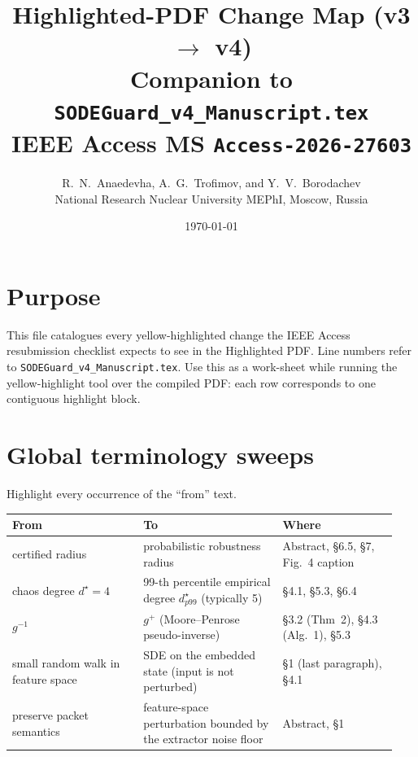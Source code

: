 \documentclass[11pt,letterpaper]{article}
\title{\vspace{-1.2cm}\textbf{Highlighted-PDF Change Map (v3 $\rightarrow$ v4)}\\[4pt]
       \normalsize Companion to \texttt{SODEGuard\_v4\_Manuscript.tex}\\
       \normalsize IEEE Access MS \texttt{Access-2026-27603}}
\author{R.\ N.\ Anaedevha, A.\ G.\ Trofimov, and Y.\ V.\ Borodachev\\
        \normalsize National Research Nuclear University MEPhI, Moscow, Russia}
\date{\normalsize \today}
\begin{document}
\maketitle
\thispagestyle{fancy}
\vspace{-0.6cm}

\section*{Purpose}
This file catalogues every yellow-highlighted change the IEEE Access
resubmission checklist expects to see in the Highlighted PDF. Line
numbers refer to \texttt{SODEGuard\_v4\_Manuscript.tex}. Use this as a
work-sheet while running the yellow-highlight tool over the compiled
PDF: each row corresponds to one contiguous highlight block.

\section{Global terminology sweeps}
Highlight every occurrence of the ``from'' text.
\begin{center}\small
\begin{tabular}{@{}p{0.32\linewidth}p{0.34\linewidth}p{0.28\linewidth}@{}}
\toprule
\textbf{From} & \textbf{To} & \textbf{Where} \\
\midrule
certified radius & probabilistic robustness radius & Abstract, \S6.5, \S7, Fig.~4 caption \\
chaos degree $d^\star=4$ & 99-th percentile empirical degree $d^\star_{p99}$ (typically 5) & \S4.1, \S5.3, \S6.4 \\
$g^{-1}$ & $g^{+}$ (Moore--Penrose pseudo-inverse) & \S3.2 (Thm~2), \S4.3 (Alg.~1), \S5.3 \\
small random walk in feature space & SDE on the embedded state (input is not perturbed) & \S1 (last paragraph), \S4.1 \\
preserve packet semantics & feature-space perturbation bounded by the extractor noise floor & Abstract, \S1 \\
\bottomrule
\end{tabular}
\end{center}

\end{document}
